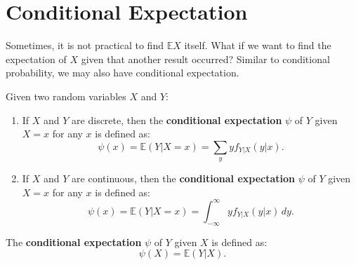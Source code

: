 \documentclass{huhtakm-template-book-v2}
\newcommand{\expect}{\mathbb{E}}
\begin{document}
\section{Conditional Expectation}
    Sometimes, it is not practical to find $\expect{X}$ itself. What if we want to find the expectation of $X$ given that another result occurred? Similar to conditional probability, we may also have conditional expectation.
    \begin{defn}
        Given two random variables $X$ and $Y$:
        \begin{enumerate}
            \item If $X$ and $Y$ are discrete, then the \textbf{conditional expectation} $\psi$ of $Y$ given $X = x$ for any $x$ is defined as:
            \begin{equation*}
                \psi(x) = \expect(Y|X = x) = \sum_{y}yf_{Y|X}(y|x).
            \end{equation*}
            \item If $X$ and $Y$ are continuous, then the \textbf{conditional expectation} $\psi$ of $Y$ given $X = x$ for any $x$ is defined as:
            \begin{equation*}
                \psi(x) = \expect(Y|X = x) = \int_{-\infty}^{\infty} yf_{Y|X}(y|x)\,dy.
            \end{equation*}
        \end{enumerate}
        The \textbf{conditional expectation} $\psi$ of $Y$ given $X$ is defined as:
        \begin{equation*}
            \psi(X) = \expect(Y|X).
        \end{equation*}
    \end{defn}
\end{document}
